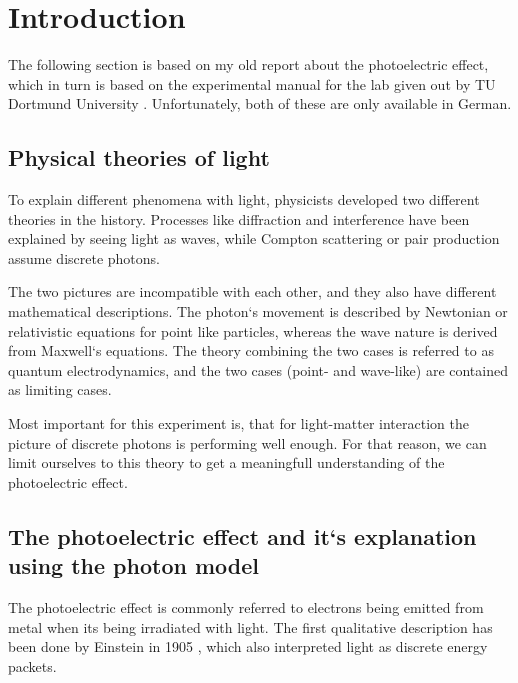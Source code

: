 \section{Introduction}
\label{sec:introduction}
The following section is based on my old report about the photoelectric effect, which in turn is
based on the experimental manual for the lab given out by TU Dortmund University
\cite{V500,anleitung}. Unfortunately,
both of these are only available in German.

\subsection{Physical theories of light}
\label{sec:intr:theory}
To explain different phenomena with light, physicists developed two different theories in the
history. Processes like diffraction and interference have been explained by seeing light as waves,
while Compton scattering or pair production assume discrete photons. 

The two pictures are incompatible with each other, and they also have different mathematical
descriptions. The photon`s movement is described by Newtonian or relativistic equations for
point like particles, whereas the wave nature is derived from Maxwell`s equations. The theory
combining the two cases is referred to as quantum electrodynamics, and the two cases (point- and 
wave-like) are contained as limiting cases.

Most important for this experiment is, that for light-matter interaction the picture of discrete
photons is performing well enough. For that reason, we can limit ourselves to this theory to get a
meaningfull understanding of the photoelectric effect.

\subsection{The photoelectric effect and it`s explanation using the photon model}
\label{sec:intr:photoeffect}
The photoelectric effect is commonly referred to electrons being emitted from metal when its being
irradiated with light. The first qualitative description has been done by Einstein in 1905
\cite{https://doi.org/10.1002/andp.19053220607}, which also interpreted light as discrete energy
packets.

